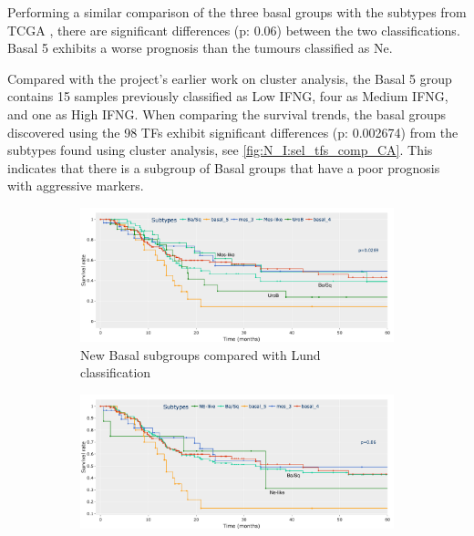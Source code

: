 Performing a similar comparison of the three basal groups with the subtypes from TCGA \citep{Robertson2017-mg}, there are significant differences (p: 0.06) between the two classifications. Basal 5 exhibits a worse prognosis than the tumours classified as Ne.

Compared with the project's earlier work on cluster analysis, the Basal 5 group contains 15 samples previously classified as Low IFNG, four as Medium IFNG, and one as High IFNG. When comparing the survival trends, the basal groups discovered using the 98 TFs exhibit significant differences (p: 0.002674) from the subtypes found using cluster analysis, see \cref{fig:N_I:sel_tfs_comp_CA}. This indicates that there is a subgroup of Basal groups that have a poor prognosis with aggressive markers.

\begin{figure}[!htb]
    \centering
    \begin{subfigure}[!t]{1.0\textwidth}
       \includegraphics[width=1.0\textwidth,keepaspectratio]{Sections/Network_I/Resources/selective_pruning/sel_tfs/comp_leiden_survival.png}
        \caption{New Basal subgroups compared with Lund classification}
        \label{fig:N_I:sel_tfs_comp_leiden}
    \end{subfigure}
    \begin{subfigure}[!t]{1.0\textwidth}
        \includegraphics[width=1.0\textwidth,keepaspectratio]{Sections/Network_I/Resources/selective_pruning/sel_tfs/comp_leiden_survival_tcga.png}

\end{subfigure}
\end{figure}
